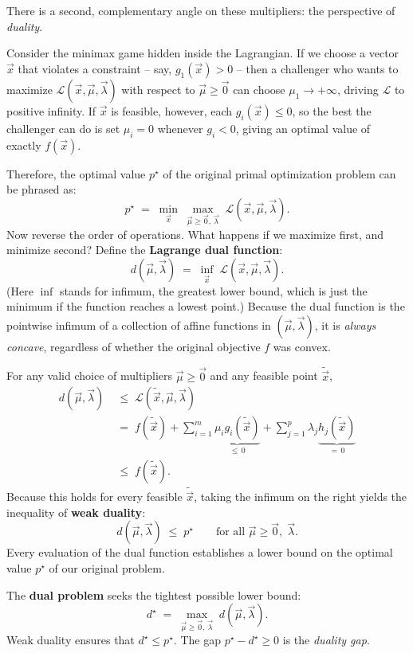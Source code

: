 There is a second, complementary angle on these multipliers: the perspective of \emph{duality}.

Consider the minimax game hidden inside the Lagrangian. If we choose a vector $\vec{x}$ that violates a constraint -- say, $g_1(\vec{x}) > 0$ -- then a challenger who wants to maximize $\mathcal{L}(\vec{x}, \vec{\mu}, \vec{\lambda})$ with respect to $\vec{\mu} \ge \vec{0}$ can choose $\mu_1 \to +\infty$, driving $\mathcal{L}$ to positive infinity. If $\vec{x}$ is feasible, however, each $g_i(\vec{x}) \le 0$, so the best the challenger can do is set $\mu_i = 0$ whenever $g_i < 0$, giving an optimal value of exactly $f(\vec{x})$.

Therefore, the optimal value $p^\star$ of the original primal optimization problem can be phrased as:
\[
  p^\star \;=\; \min_{\vec{x}} \; \max_{\vec{\mu} \ge \vec{0}, \, \vec{\lambda}} \; \mathcal{L}(\vec{x}, \vec{\mu}, \vec{\lambda}).
\]
Now reverse the order of operations. What happens if we maximize first, and minimize second? Define the \textbf{Lagrange dual function}:
\[
  d(\vec{\mu}, \vec{\lambda}) \;=\; \inf_{\vec{x}} \; \mathcal{L}(\vec{x}, \vec{\mu}, \vec{\lambda}).
\]
(Here $\inf$ stands for infimum, the greatest lower bound, which is just the minimum if the function reaches a lowest point.)
Because the dual function is the pointwise infimum of a collection of affine functions in $(\vec{\mu}, \vec{\lambda})$, it is \emph{always concave}, regardless of whether the original objective $f$ was convex.

For any valid choice of multipliers $\vec{\mu} \ge \vec{0}$ and any feasible point $\tilde{\vec{x}}$,
\begin{align*}
  d(\vec{\mu}, \vec{\lambda}) &\;\le\; \mathcal{L}(\tilde{\vec{x}}, \vec{\mu}, \vec{\lambda}) \\
  &\;=\; f(\tilde{\vec{x}}) + \sum_{i=1}^m \underbrace{\mu_i g_i(\tilde{\vec{x}})}_{\le\, 0} + \sum_{j=1}^p \lambda_j \underbrace{h_j(\tilde{\vec{x}})}_{=\,0} \\
  &\;\le\; f(\tilde{\vec{x}}).
\end{align*}
Because this holds for every feasible $\tilde{\vec{x}}$, taking the infimum on the right yields the inequality of \textbf{weak duality}:
\[
  d(\vec{\mu}, \vec{\lambda}) \;\le\; p^\star \qquad \text{for all } \vec{\mu} \ge \vec{0}, \; \vec{\lambda}.
\]
Every evaluation of the dual function establishes a lower bound on the optimal value $p^\star$ of our original problem.

The \textbf{dual problem} seeks the tightest possible lower bound:
\[
  d^\star \;=\; \max_{\vec{\mu} \ge \vec{0}, \, \vec{\lambda}} \; d(\vec{\mu}, \vec{\lambda}).
\]
Weak duality ensures that $d^\star \le p^\star$. The gap $p^\star - d^\star \ge 0$ is the \emph{duality gap}.

